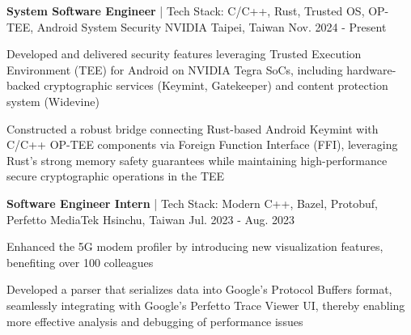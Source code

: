 

\begin{cventries}

  \cventry
    {\textbf {System Software Engineer} | \color{awesome} Tech Stack: C/C++, Rust, Trusted OS, OP-TEE, Android System Security} %
    {NVIDIA} %
    {Taipei, Taiwan} %
    {Nov. 2024 - Present} %
    {
      \begin{cvitems} %
        \item {Developed and delivered security features leveraging Trusted Execution Environment (TEE) for Android on NVIDIA Tegra SoCs, including hardware-backed cryptographic services (Keymint, Gatekeeper) and content protection system (Widevine)}
        \item {Constructed a robust bridge connecting Rust-based Android Keymint with C/C++ OP-TEE components via Foreign Function Interface (FFI), leveraging Rust's strong memory safety guarantees while maintaining high-performance secure cryptographic operations in the TEE}
      \end{cvitems}
    }

  \vspace{12pt}
  \cventry
    {\textbf {Software Engineer Intern} | \color{awesome} Tech Stack: Modern C++, Bazel, Protobuf, Perfetto} %
    {MediaTek} %
    {Hsinchu, Taiwan} %
    {Jul. 2023 - Aug. 2023} %
    {
      \begin{cvitems} %
        \item {Enhanced the 5G modem profiler by introducing new visualization features, benefiting over 100 colleagues}
        \item {Developed a parser that serializes data into Google's Protocol Buffers format, seamlessly integrating with Google's Perfetto Trace Viewer UI, thereby enabling more effective analysis and debugging of performance issues}
      \end{cvitems}
    }


\end{cventries}
